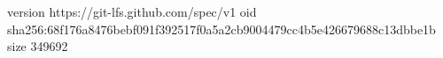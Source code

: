 version https://git-lfs.github.com/spec/v1
oid sha256:68f176a8476bebf091f392517f0a5a2cb9004479cc4b5e426679688c13dbbe1b
size 349692
